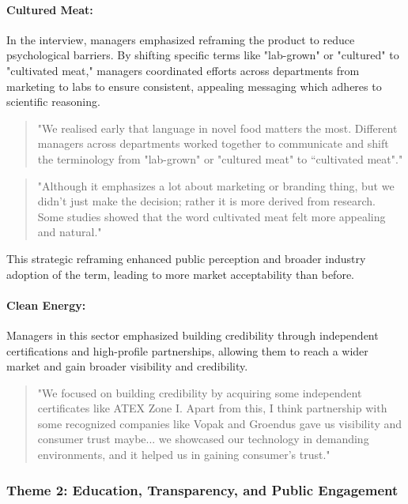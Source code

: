 \paragraph{Cultured Meat:} In the interview, managers emphasized reframing the product to reduce psychological barriers. By shifting specific terms like "lab-grown" or "cultured" to "cultivated meat," managers coordinated efforts across departments from marketing to labs to ensure consistent, appealing messaging which adheres to scientific reasoning.
\begin{quote}
	"We realised early that language in novel food matters the most. Different managers across departments worked together to communicate and shift the terminology from "lab-grown" or "cultured meat" to “cultivated meat"."
\end{quote}
\begin{quote}
	"Although it emphasizes a lot about marketing or branding thing, but we didn't just make the decision; rather it is more derived from research. Some studies showed that the word cultivated meat felt more appealing and natural."
\end{quote}
This strategic reframing enhanced public perception and broader industry adoption of the term, leading to more market acceptability than before.

\paragraph{Clean Energy:} Managers in this sector emphasized building credibility through independent certifications and high-profile partnerships, allowing them to reach a wider market and gain broader visibility and credibility.
\begin{quote}
	"We focused on building credibility by acquiring some independent certificates like ATEX Zone I. Apart from this, I think partnership with some recognized companies like Vopak and Groendus gave us visibility and consumer trust maybe... we showcased our technology in demanding environments, and it helped us in gaining consumer's trust."
\end{quote}

\subsubsection{Theme 2: Education, Transparency, and Public Engagement}

